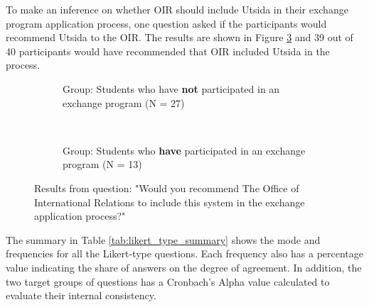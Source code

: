 \FloatBarrier


To make an inference on whether OIR should include Utsida in their exchange program application process, one question asked if the participants would recommend Utsida to the OIR. The results are shown in Figure \ref{fig:office_recommendation} and 39 out of 40 participants would have recommended that OIR included Utsida in the process. 

\FloatBarrier

\begin{figure}[h]
    \centering
    \begin{subfigure}[b]{0.4\textwidth}
        
        \caption{Group: Students who have \textbf{not} participated in an exchange program (N = 27)}
        \label{fig:office_recommendation_p1}
    \end{subfigure}
    ~ \qquad %
    \begin{subfigure}[b]{0.4\textwidth}
       
        \caption{Group: Students who \textbf{have} participated in an exchange program (N = 13)}
        \label{fig:office_recommendation_p2}
    \end{subfigure}
    \caption[Result from question on recommendation to OIR]{Results from question: "Would you recommend The Office of International Relations to include this system in the exchange application process?"}
    \label{fig:office_recommendation}
\end{figure}


\FloatBarrier

The summary in Table \ref{tab:likert_type_summary} shows the mode and frequencies for all the Likert-type questions. Each frequency also has a percentage value indicating the share of answers on the degree of agreement. In addition, the two target groups of questions has a Cronbach's Alpha value calculated to evaluate their internal consistency.



